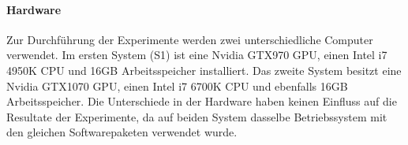 \paragraph{Hardware}
\label{technichal_setup:hardware}
Zur Durchführung der Experimente werden zwei unterschiedliche Computer verwendet. Im ersten System (S1) ist eine Nvidia GTX970 GPU, einen Intel i7 4950K CPU und 16GB Arbeitsspeicher installiert. Das zweite System besitzt eine Nvidia GTX1070 GPU, einen Intel i7 6700K CPU und ebenfalls 16GB Arbeitsspeicher. Die Unterschiede in der Hardware haben keinen Einfluss auf die Resultate der Experimente, da auf beiden System dasselbe Betriebssystem mit den gleichen Softwarepaketen verwendet wurde.

